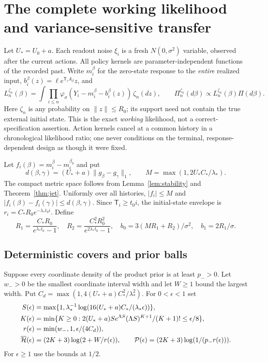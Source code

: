 \section{The complete working likelihood and variance-sensitive transfer}
\label{sec:likelihood}
Let $U_*=U_0+a$. Each readout noise $\xi_i$ is a fresh $N(0,\sigma^2)$
variable, observed after the current actions. All policy kernels are
parameter-independent functions of the recorded past. Write $m_i^\beta$ for
the zero-state response to the \emph{entire} realized input,
$b_i^\beta(z)=\ell e^{\mathsf T_iA_\beta}z$, and
\begin{equation}
 L_n^{\zeta_n}(\beta)=\int\prod_{i\le n}
 \varphi_\sigma(Y_i-m_i^\beta-b_i^\beta(z))\,\zeta_n(dz),\qquad
 \Pi_n^{\zeta_n}(d\beta)\propto L_n^{\zeta_n}(\beta)\Pi(d\beta).
 \label{eq:likelihood}
\end{equation}
Here $\zeta_n$ is any probability on $\|z\|\le R_0$; its support need not
contain the true external initial state. This is the exact \emph{working}
likelihood, not a correct-specification assertion. Action kernels cancel at
a common history in a chronological likelihood ratio; one never conditions
on the terminal, response-dependent design as though it were fixed.

Let $f_i(\beta)=m_i^\beta-m_i^{\beta_0}$ and put
\[
 d(\beta,\gamma)=(U_*+a)\|g_\beta-g_\gamma\|_1,\qquad
 M=\max(1,2U_*C_*/\lambda_*).
\]
The compact metric space follows from Lemma~\ref{lem:stability} and
Theorem~\ref{thm:jet}. Uniformly over all histories,
$|f_i|\le M$ and $|f_i(\beta)-f_i(\gamma)|\le d(\beta,\gamma)$.
Since $\mathsf T_i\ge t_0i$, the initial-state envelope is
$r_i=C_*R_0e^{-\lambda_*t_0i}$. Define
\[
 R_1=\frac{C_*R_0}{e^{\lambda_*t_0}-1},\quad
 R_2=\frac{C_*^2R_0^2}{e^{2\lambda_*t_0}-1},\quad
 b_0=3(MR_1+R_2)/\sigma^2,\quad b_1=2R_1/\sigma.
\]

\subsection{Deterministic covers and prior balls}
Suppose every coordinate density of the product prior is at least $p_->0$.
Let $w_->0$ be the smallest coordinate interval width and let $W\ge1$ bound
the largest width. Put $C_d=\max(1,4(U_*+a)C_*^2/\lambda_*^2)$.
For $0<\epsilon<1$ set
\begin{align}
 S(\epsilon)&=\max\{1,\lambda_*^{-1}
 \log(16(U_*+a)C_*/(\lambda_*\epsilon))\},\notag\\
 K(\epsilon)&=\min\{K\ge0:2(U_*+a)S e^{\Lambda S}
 (\Lambda S)^{K+1}/(K+1)!\le\epsilon/8\},\notag\\
 r(\epsilon)&=\min(w_-,1,\epsilon/(4C_d)),\notag\\
 \overline{\mathcal H}(\epsilon)&=(2K+3)\log(2+W/r(\epsilon)),\qquad
 \mathcal P(\epsilon)=(2K+3)\log(1/(p_-r(\epsilon))).
 \label{eq:entropy}
\end{align}
For $\epsilon\ge1$ use the bounds at $1/2$.

